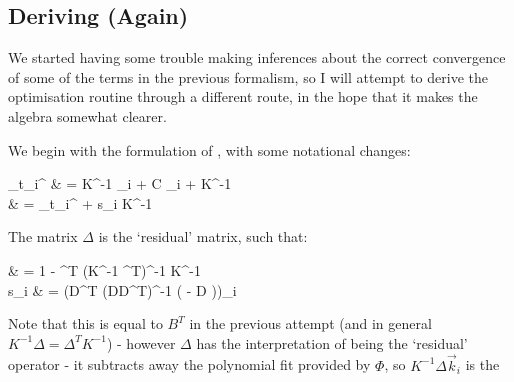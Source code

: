 \documentclass[]{article}
\def\ai{\vec{a}_{t_i}}
\begin{document}
	
			
	\subsection{Deriving (Again)}
		
		We started having some trouble making inferences about the correct convergence of some of the terms in the previous formalism, so I will attempt to derive the optimisation routine through a different route, in the hope that it makes the algebra somewhat clearer. 

		We begin with the formulation of , with some notational changes:
		\begin{spalign}
			\ai^ & = K^{-1} \Delta {}_i + C \vec{\varphi}_i +  K^{-1} \Delta {}
			\\
			& = \ai^ + s_i K^{-1} \Delta {}
		\end{spalign}
		The matrix $\Delta$ is the `residual' matrix, such that:
		\begin{spalign}
			\Delta & = 1 - \Phi^T (\Phi K^{-1} \Phi^T)^{-1} \Phi K^{-1}
			\\
			s_i & = \left(D^T (DD^T)^{-1} ( - D \vec{\alpha})\right)\cdot \hat{e}_i
		\end{spalign}
		Note that this is equal to $B^T$ in the previous attempt (and in general $K^{-1} \Delta = \Delta^T K^{-1}$) - however $\Delta$ has the interpretation of being the `residual' operator - it subtracts away the polynomial fit provided by $\Phi$, so $K^{-1} \Delta \vec{k}_i$ is the 
\end{document}
